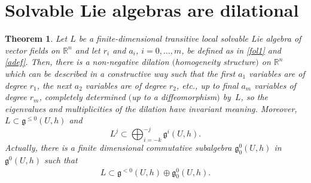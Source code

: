 \documentclass[11pt]{article}
\numberwithin{equation}{section}
\numberwithin{equation}{section}
\newtheorem{Theorem}{Theorem}[section]
\begin{document}
\section{Solvable Lie algebras are dilational}
\begin{Theorem}\label{main}
Let $L$ be a finite-dimensional transitive local solvable Lie algebra of vector fields on ${\mathbb R}^n$ and let $r_i$ and $a_i$, $i=0,\dots,m$, be defined as in \eqref{fol1} and \eqref{adef}. Then, there is a non-negative dilation $($homogeneity structure$)$ on ${\mathbb R}^n$ which can be described in a constructive way such that the first $a_1$ variables are of degree $r_1$, the next $a_2$ variables are of degree $r_2$, etc., up to final $a_m$ variables of degree $r_m$, completely determined $($up to a diffeomorphism$)$ by~$L$, so the eigenvalues and multiplicities of the dilation have invariant meaning.
Moreover, $L\subset\mathfrak{g}^{\le 0}(U,h)$ and
$$L^j\subset \bigoplus_{i=-k}^{-j}\mathfrak{g}^i(U,h) .$$
Actually, there is a finite dimensional commutative subalgebra $\mathfrak{{g}}^{0}_0(U,h)$ in $\mathfrak{{g}}^{0}(U,h)$ such that
\begin{gather}\label{solv} L \subset \mathfrak{g}^{<0}(U,h)\oplus \mathfrak{g}_0^{0}(U,h) .
\end{gather}
\end{Theorem}
\end{document}
